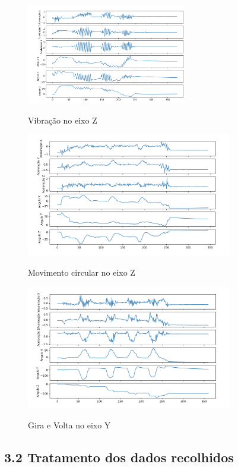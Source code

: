 \begin{figure}[H]
    \center
    \includegraphics[width=7cm]{images/VibracaoZ.png}
    \label{img3}
    \caption{Vibração no eixo Z}
\end{figure}

\begin{figure}[H]
    \center
    \includegraphics[width=9cm]{images/CirculoZ.png}
    \label{img4}
    \caption{Movimento circular no eixo Z}
\end{figure}

\begin{figure}[H]
    \center
    \includegraphics[width=9cm]{images/GiraeVoltaY.png}
    \label{img5}
    \caption{ Gira e Volta no eixo Y }
\end{figure}




\subsection*{3.2 Tratamento dos dados recolhidos}

